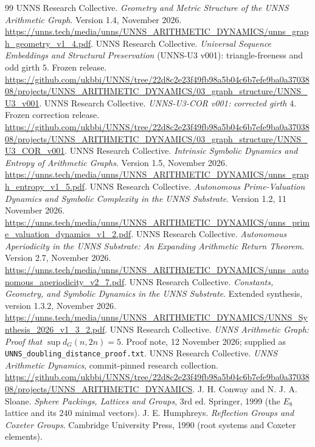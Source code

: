 \documentclass[11pt,a4paper]{article}
\theoremstyle{definition}\newtheorem{definition}[theorem]{Definition}
\begin{document}
\begin{thebibliography}{99}\setlength{\itemsep}{4pt}
 UNNS Research Collective. \emph{Geometry and Metric Structure of the UNNS Arithmetic Graph}. Version 1.4, November 2026. \url{https://unns.tech/media/unns/UNNS_ARITHMETIC_DYNAMICS/unns_graph_geometry_v1_4.pdf}.
 UNNS Research Collective. \emph{Universal Sequence Embeddings and Structural Preservation} (UNNS-U3 v001): triangle-freeness and odd girth $5$. Frozen release. \url{https://github.com/ukbbi/UNNS/tree/22d8c2e23f49fb98a5b04c6b7efe9ba0a3703808/projects/UNNS_ARITHMETIC_DYNAMICS/03_graph_structure/UNNS_U3_v001}.
 UNNS Research Collective. \emph{UNNS-U3-COR v001: corrected girth $4$}. Frozen correction release. \url{https://github.com/ukbbi/UNNS/tree/22d8c2e23f49fb98a5b04c6b7efe9ba0a3703808/projects/UNNS_ARITHMETIC_DYNAMICS/03_graph_structure/UNNS_U3_COR_v001}.
 UNNS Research Collective. \emph{Intrinsic Symbolic Dynamics and Entropy of Arithmetic Graphs}. Version 1.5, November 2026. \url{https://unns.tech/media/unns/UNNS_ARITHMETIC_DYNAMICS/unns_graph_entropy_v1_5.pdf}.
 UNNS Research Collective. \emph{Autonomous Prime-Valuation Dynamics and Symbolic Complexity in the UNNS Substrate}. Version 1.2, 11 November 2026. \url{https://unns.tech/media/unns/UNNS_ARITHMETIC_DYNAMICS/unns_prime_valuation_dynamics_v1_2.pdf}.
 UNNS Research Collective. \emph{Autonomous Aperiodicity in the UNNS Substrate: An Expanding Arithmetic Return Theorem}. Version 2.7, November 2026. \url{https://unns.tech/media/unns/UNNS_ARITHMETIC_DYNAMICS/unns_autonomous_aperiodicity_v2_7.pdf}.
 UNNS Research Collective. \emph{Constants, Geometry, and Symbolic Dynamics in the UNNS Substrate}. Extended synthesis, version 1.3.2, November 2026. \url{https://unns.tech/media/unns/UNNS_ARITHMETIC_DYNAMICS/UNNS_Synthesis_2026_v1_3_2.pdf}.
 UNNS Research Collective. \emph{UNNS Arithmetic Graph: Proof that $\sup d_G(n,2n)=5$}. Proof note, 12 November 2026; supplied as \texttt{UNNS\_doubling\_distance\_proof.txt}.
 UNNS Research Collective. \emph{UNNS Arithmetic Dynamics}, commit-pinned research collection. \url{https://github.com/ukbbi/UNNS/tree/22d8c2e23f49fb98a5b04c6b7efe9ba0a3703808/projects/UNNS_ARITHMETIC_DYNAMICS}.
 J. H. Conway and N. J. A. Sloane. \emph{Sphere Packings, Lattices and Groups}, 3rd ed. Springer, 1999 (the $E_8$ lattice and its $240$ minimal vectors).
 J. E. Humphreys. \emph{Reflection Groups and Coxeter Groups}. Cambridge University Press, 1990 (root systems and Coxeter elements).

\end{thebibliography}
\end{document}
